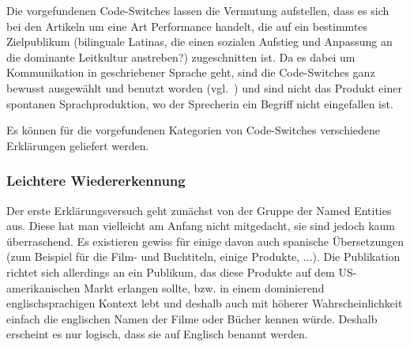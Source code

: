 Die vorgefundenen Code-Switches lassen die Vermutung aufstellen, dass es sich bei den Artikeln um eine Art Performance handelt, die auf ein bestimmtes Zielpublikum (bilinguale Latinas, die einen sozialen Aufstieg und Anpassung an die dominante Leitkultur anstreben?) zugeschnitten ist.
Da es dabei um Kommunikation in geschriebener Sprache geht, sind die Code-Switches ganz bewusst ausgewählt und benutzt worden (vgl.~\cite{Mahootian05}) und sind nicht das Produkt einer spontanen Sprachproduktion, wo der Sprecherin ein Begriff nicht eingefallen ist.

Es können für die vorgefundenen Kategorien von Code-Switches verschiedene Erklärungen geliefert werden.

\begin{comment}
Bei den Named Entities aber auch bei bestimmten andere Sachen, wie z.B. Rezeptzutaten
Hier kann man die Sozioindexikalität und die indexikalischen Felder wieder hervorrufen;
Zugehörigkeit auf verschiedenen Ebenen:
- Evokation(ist das ein Deutsches Wort?) einer bilinguale Identität/Komplizenschaft zwischen Herausgeberinnen und Leserinnen
- Zugehörigkeit zu einem hippen erfolgreichen Lifestyle (vlt geht das bereits auch in Prestige über?)


\end{comment}

\subsubsection{Leichtere Wiedererkennung}
Der erste Erklärungsversuch geht zunächst von der Gruppe der Named Entities aus.
Diese hat man vielleicht am Anfang nicht mitgedacht, sie sind jedoch kaum überraschend.
Es existieren gewiss für einige davon auch spanische Übersetzungen (zum Beispiel für die Film- und Buchtiteln, einige Produkte, ...).
Die Publikation richtet sich allerdings an ein Publikum, das diese Produkte auf dem US-amerikanischen Markt erlangen sollte, bzw. in einem dominierend englischsprachigen Kontext lebt und deshalb auch mit höherer Wahrscheinlichkeit einfach die englischen Namen der Filme oder Bücher kennen würde.
Deshalb erscheint es nur logisch, dass sie auf Englisch benannt werden.

